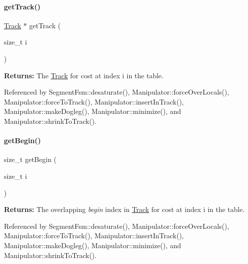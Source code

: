 \mbox{\label{classKite_1_1SegmentFsm_af2d9a3a5df8a4de5d263fb3fae563a8a}} 
\paragraph{\texorpdfstring{get\+Track()}{getTrack()}}
{\footnotesize\ttfamily \hyperlink{classKite_1_1Track}{Track} $\ast$ get\+Track (\begin{DoxyParamCaption}\item[{size\+\_\+t}]{i }\end{DoxyParamCaption})\hspace{0.3cm}{\ttfamily [inline]}}

{\bfseries Returns\+:} The \hyperlink{classKite_1_1Track}{Track} for cost at index {\ttfamily i} in the table. 

Referenced by Segment\+Fsm\+::desaturate(), Manipulator\+::force\+Over\+Locals(), Manipulator\+::force\+To\+Track(), Manipulator\+::insert\+In\+Track(), Manipulator\+::make\+Dogleg(), Manipulator\+::minimize(), and Manipulator\+::shrink\+To\+Track().

\mbox{\label{classKite_1_1SegmentFsm_a13a1ec8bdcf29f2bcb21cab348b77ed2}} 
\paragraph{\texorpdfstring{get\+Begin()}{getBegin()}}
{\footnotesize\ttfamily size\+\_\+t get\+Begin (\begin{DoxyParamCaption}\item[{size\+\_\+t}]{i }\end{DoxyParamCaption})\hspace{0.3cm}{\ttfamily [inline]}}

{\bfseries Returns\+:} The overlapping {\itshape begin} index in \hyperlink{classKite_1_1Track}{Track} for cost at index {\ttfamily i} in the table. 

Referenced by Segment\+Fsm\+::desaturate(), Manipulator\+::force\+Over\+Locals(), Manipulator\+::force\+To\+Track(), Manipulator\+::insert\+In\+Track(), Manipulator\+::make\+Dogleg(), Manipulator\+::minimize(), and Manipulator\+::shrink\+To\+Track().

